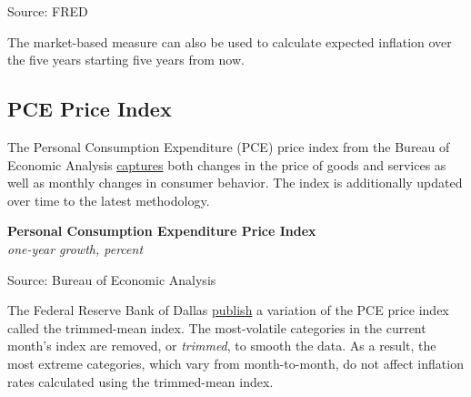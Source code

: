 \documentclass{report}
\makeatletter
\newcommand{\tbllink}[1]{\href{https://raw.githubusercontent.com/bdecon/US-chartbook/master/chartbook/data/#1}{\faTable}}
\newcommand*\short[1]{\expandafter\@gobbletwo\number\numexpr#1\relax}
\newcommand{\dateaxisticks}{
		date coordinates in=x, axis line style={draw=none},
		xmax={2023-11-01},
		max space between ticks=40,	    
		xtick={{1990-01-01}, {1992-01-01}, {1994-01-01}, 
			{1996-01-01}, {1998-01-01}, {2000-01-01}, 
			{2002-01-01}, {2004-01-01}, {2006-01-01},
			{2008-01-01}, {2010-01-01}, {2012-01-01}, {2014-01-01},
		    {2016-01-01}, {2018-01-01}, {2020-01-01}, {2022-01-01}, 
		    {2024-01-01}, {2026-01-01}},
		minor xtick={{1989-01-01}, {1991-01-01}, {1993-01-01},
			{1995-01-01}, {1997-01-01}, {1999-01-01}, 
			{2001-01-01}, {2003-01-01}, {2005-01-01}, {2007-01-01},
		    {2009-01-01}, {2011-01-01}, {2013-01-01}, {2015-01-01},
		    {2017-01-01}, {2019-01-01}, {2021-01-01}, {2023-01-01}, 
		    {2025-01-01}, {2027-01-01}},
		enlarge y limits={0.06}, enlarge x limits={0.01},
		}
\newcommand{\bbar}[2]{extra #1 ticks = {{#2}}, extra #1 tick labels = ,
		extra #1 tick style = {grid=major, grid style={thick, black!25}},}
\newcommand{\stdline}[4]{\addplot[very thick, no markers, color=#1] 
		table [x=#2, y=#3, col sep=comma] {#4};	}
\newcommand{\rbars}{
		\fill[color=black!10] (axis cs:{1990-07-01},\pgfkeysvalueof{/pgfplots/ymin}) rectangle 
			(axis cs:{1991-03-01}, \pgfkeysvalueof{/pgfplots/ymax});
		\fill[color=black!10] (axis cs:{2007-12-01},\pgfkeysvalueof{/pgfplots/ymin}) rectangle 
			(axis cs:{2009-07-01}, \pgfkeysvalueof{/pgfplots/ymax});
		\fill[color=black!10] (axis cs:{2001-03-01},\pgfkeysvalueof{/pgfplots/ymin}) rectangle 
			(axis cs:{2001-11-01}, \pgfkeysvalueof{/pgfplots/ymax});
		\fill[color=black!10] (axis cs:{2020-02-01},\pgfkeysvalueof{/pgfplots/ymin}) rectangle 
			(axis cs:{2020-05-01}, \pgfkeysvalueof{/pgfplots/ymax});}
\makeatother
\begin{document}
{{\begin{minipage}{0.47\textwidth}
\footnotesize{Source: FRED} \hfill \tbllink{infbreak_comb.csv}
\end{minipage} \hspace{5mm} 
\begin{minipage}{0.245\textwidth}
\small The market-based measure can also be used to calculate expected inflation over the five years starting five years from now. 
\end{minipage}
\newpage
\hypertarget{prpce}{\label{prpce}}
\begin{minipage}{0.76\textwidth}
\subsection*{PCE Price Index}
\small The Personal Consumption Expenditure (PCE) price index from the Bureau of Economic Analysis \href{https://www.bea.gov/data/personal-consumption-expenditures-price-index}{captures} both changes in the price of goods and services as well as monthly changes in consumer behavior. The index is additionally updated over time to the latest methodology. 


\vspace{1mm}

\normalsize \textbf{Personal Consumption Expenditure Price Index}\\
\footnotesize{\textit{one-year growth, percent}}
\vspace{3.8cm}

\hspace{2mm} 

\footnotesize{Source: Bureau of Economic Analysis} \hfill \tbllink{pce_pi.csv}
\vspace{5mm}

\small The Federal Reserve Bank of Dallas \href{https://www.dallasfed.org/research/pce}{publish} a variation of the PCE price index called the trimmed-mean index. The most-volatile categories in the current month's index are removed, or \textit{trimmed}, to smooth the data. As a result, the most extreme categories, which vary from month-to-month, do not affect inflation rates calculated using the trimmed-mean index. 


\end{minipage}}}
\end{document}
